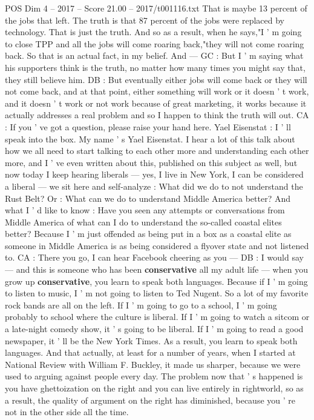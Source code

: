 \begin{textsample}{POS Dim 4 – 2017 – Score 21.00 – 2017/t001116.txt}
That is maybe 13 percent of the jobs that left.
The truth is that 87 percent of the jobs were replaced by technology.
That is just the truth.
And so as a result, when he says,"I ' m going to close TPP and all the jobs will come roaring back,"they will not come roaring back.
So that is an actual fact, in my belief.
And — GC : But I ' m saying what his supporters think is the truth, no matter how many times you might say that, they still believe him.
DB : But eventually either jobs will come back or they will not come back, and at that point, either something will work or it doesn ' t work, and it doesn ' t work or not work because of great marketing, it works because it actually addresses a real problem and so I happen to think the truth will out.
CA : If you ' ve got a question, please raise your hand here.
Yael Eisenstat : I ' ll speak into the box.
My name ' s Yael Eisenstat.
I hear a lot of this talk about how we all need to start talking to each other more and understanding each other more, and I ' ve even written about this, published on this subject as well, but now today I keep hearing liberals — yes, I live in New York, I can be considered a liberal — we sit here and self-analyze : What did we do to not understand the Rust Belt?
Or : What can we do to understand Middle America better?
And what I ' d like to know : Have you seen any attempts or conversations from Middle America of what can I do to understand the so-called coastal elites better?
Because I ' m just offended as being put in a box as a coastal elite as someone in Middle America is as being considered a flyover state and not listened to.
CA : There you go, I can hear Facebook cheering as you — DB : I would say — and this is someone who has been \textbf{conservative} all my adult life — when you grow up \textbf{conservative}, you learn to speak both languages.
Because if I ' m going to listen to music, I ' m not going to listen to Ted Nugent.
So a lot of my favorite rock bands are all on the left.
If I ' m going to go to a school, I ' m going probably to school where the culture is liberal.
If I ' m going to watch a sitcom or a late-night comedy show, it ' s going to be liberal.
If I ' m going to read a good newspaper, it ' ll be the New York Times.
As a result, you learn to speak both languages.
And that actually, at least for a number of years, when I started at National Review with William F.
Buckley, it made us sharper, because we were used to arguing against people every day.
The problem now that ' s happened is you have ghettoization on the right and you can live entirely in rightworld, so as a result, the quality of argument on the right has diminished, because you ' re not in the other side all the time.

\end{textsample}
